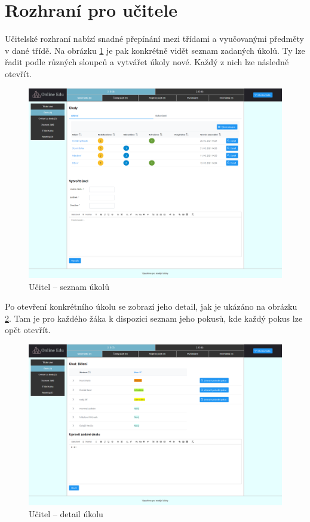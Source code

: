 \documentclass[twoside]{ctuthesis}
\theoremstyle{plain}
\theoremstyle{definition}
\theoremstyle{note}
\begin{document}
\section{Rozhraní pro učitele}
Učitelské rozhraní nabízí snadné přepínání mezi třídami a vyučovanými předměty v dané třídě. Na obrázku \ref{ref:ucitel-seznam-ukolu} je pak konkrétně vidět seznam zadaných úkolů. Ty lze řadit podle různých sloupců a vytvářet úkoly nové. Každý z nich lze následně otevřít.
\begin{figure}[H]
    \caption{Učitel -- seznam úkolů}
    \label{ref:ucitel-seznam-ukolu}
    \centering
    \includegraphics[width=\textwidth]{images/app_screenshots/ucitel_seznam_ukolu}
\end{figure}

Po otevření konkrétního úkolu se zobrazí jeho detail, jak je ukázáno na obrázku \ref{ref:ucitel-detail-ukolu}. Tam je pro každého žáka k dispozici seznam jeho pokusů, kde každý pokus lze opět otevřít.
\begin{figure}[H]
    \caption{Učitel -- detail úkolu}
    \label{ref:ucitel-detail-ukolu}
    \centering
    \includegraphics[width=\textwidth]{images/app_screenshots/ucitel_detail_ukolu}
\end{figure}
\end{document}
